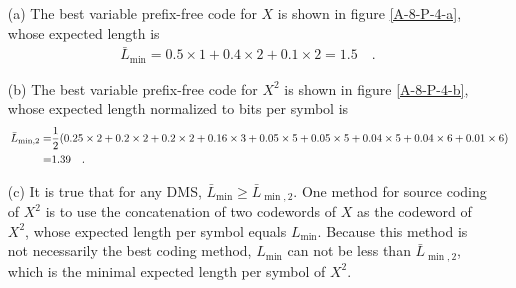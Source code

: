 \documentclass{assignment}
\begin{document}
\begin{sol}
    \begin{itemize}
        \item[(a)] The best variable prefix-free code for $X$ is shown in figure \ref{A-8-P-4-a}, whose expected length is
        \begin{align}
            \bar{L}_{\min}=0.5\times 1+0.4\times 2+0.1\times 2=1.5\quad.
        \end{align}
        \item[(b)] The best variable prefix-free code for $X^2$ is shown in figure \ref{A-8-P-4-b}, whose expected length normalized to bits per symbol is
        \begin{align}
            \notag\bar{L}_{\min,2}=&\frac{1}{2}(0.25\times 2+0.2\times 2+0.2\times 2+0.16\times 3+0.05\times 5+0.05\times 5+0.04\times 5+0.04\times 6+0.01\times 6)\\
            =&1.39\quad.
        \end{align}
        \item[(c)] It is true that for any DMS, $\bar{L}_{\min}\geq\bar{L}_{\min,2}$. One method for source coding of $X^2$ is to use the concatenation of two codewords of $X$ as the codeword of $X^2$, whose expected length per symbol equals $L_{\min}$. Because this method is not necessarily the best coding method, $L_{\min}$ can not be less than $\bar{L}_{\min,2}$, which is the minimal expected length per symbol of $X^2$.
        \begin{figure}[h]
            \centering
        \end{figure}
    \end{itemize}
\end{sol}
\end{document}
